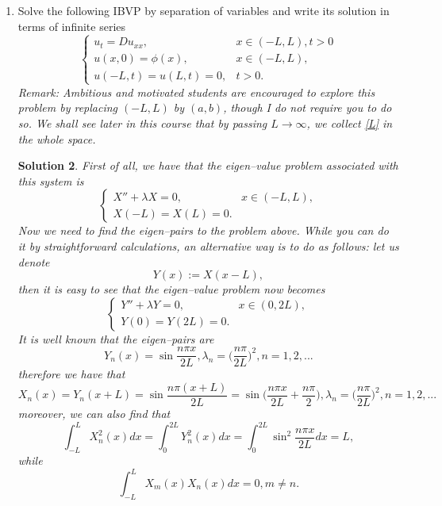 \documentclass[6pt]{article}
\newtheorem{solution}{Solution}
\numberwithin{equation}{section}
\begin{document}
\begin{enumerate}
\begin{solution}
We observe the aforementioned convergence to the average value as $t\rightarrow \infty$.   One important observation is that the steady state is determined by the boundary condition, but not the initial data; moreover, for the problem backward in time, we can find that the solution \textbf{blows up} in time, i.e., $u(x,t)\rightarrow \infty$ as $t\rightarrow -\infty$ (at least for a subsequence of such $t$) for each fixed $x\in(0,L)$.
\end{solution}


\item Solve the following IBVP by separation of variables and write its solution in terms of infinite series
\begin{equation}\label{L}
\left\{
\begin{array}{ll}
u_t=Du_{xx},& x\in(-L,L),t>0\\
u(x,0)=\phi(x),&x\in(-L,L),\\
u(-L,t)=u(L,t)=0, &t>0.
\end{array}
\right.
\end{equation}
\emph{Remark:  Ambitious and motivated students are encouraged to explore this problem by replacing $(-L,L)$ by $(a,b)$, though I do not require you to do so.  We shall see later in this course that by passing $L\rightarrow\infty$, we collect \eqref{L} in the whole space.}
\begin{solution}
First of all, we have that the eigen--value problem associated with this system is
\begin{equation*}
\left\{
\begin{array}{ll}
X''+\lambda X=0,& x\in(-L,L),\\
X(-L)=X(L)=0. &
\end{array}
\right.
\end{equation*}
Now we need to find the eigen--pairs to the problem above.  While you can do it by straightforward calculations, an alternative way is to do as follows:
let us denote
\[Y(x):=X(x-L),\]
then it is easy to see that the eigen--value problem now becomes
\begin{equation*}
\left\{
\begin{array}{ll}
Y''+\lambda Y=0,& x\in(0,2L),\\
Y(0)=Y(2L)=0. &
\end{array}
\right.
\end{equation*}
It is well known that the eigen--pairs are
\[\]
\[Y_n(x)=\sin \frac{n\pi x}{2L},\lambda_n=\Big(\frac{n\pi}{2L}\Big)^2,n=1,2,...\]
therefore we have that
\[X_n(x)=Y_n(x+L)=\sin \frac{n\pi (x+L)}{2L}=\sin \Big(\frac{n\pi x}{2L}+\frac{n\pi}{2}\Big),\lambda_n=\Big(\frac{n\pi}{2L}\Big)^2,n=1,2,...\]
moreover, we can also find that
\[\int_{-L}^L X^2_n(x)dx=\int_0^{2L}Y^2_n(x)dx=\int_0^{2L}\sin^2 \frac{n\pi x}{2L}dx=L,\]
while \[\int_{-L}^L X_m(x)X_n(x)dx=0,m\neq n.\]


\end{solution}
\end{enumerate}
\end{document}
